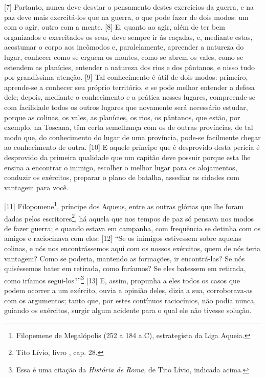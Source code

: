 {[}7{]} Portanto, nunca deve desviar o pensamento destes exercícios da
guerra, e na paz deve mais exercitá-los que na guerra, o que pode fazer
de dois modos: um com o agir, outro com a mente. {[}8{]} E, quanto ao
agir, além de ter bem organizados e exercitados os seus, deve sempre ir
às caçadas, e, mediante estas, acostumar o corpo aos incômodos e,
paralelamente, apreender a natureza do lugar, conhecer como se erguem os
montes, como se abrem os vales, como se estendem as planícies, entender
a natureza dos rios e dos pântanos, e nisso tudo por grandíssima
atenção. {[}9{]} Tal conhecimento é útil de dois modos: primeiro,
aprende-se a conhecer seu próprio território, e se pode melhor entender
a defesa dele; depois, mediante o conhecimento e a prática nesses
lugares, compreende-se com facilidade todos os outros lugares que
novamente será necessário estudar, porque as colinas, os vales, as
planícies, os rios, os pântanos, que estão, por exemplo, na Toscana, têm
certa semelhança com os de outras províncias, de tal modo que, do
conhecimento do lugar de uma província, pode-se facilmente chegar ao
conhecimento de outra. {[}10{]} E aquele príncipe que é desprovido desta
perícia é desprovido da primeira qualidade que um capitão deve possuir
porque esta lhe ensina a encontrar o inimigo, escolher o melhor lugar
para os alojamentos, conduzir os exércitos, preparar o plano de batalha,
assediar as cidades com vantagem para você.

{[}11{]} Filopomene\footnote{Filopemene de Megalópolis (252 a 184 a.C),
  estrategista da Liga Aqueia.}, príncipe dos Aqueus, entre as outras
glórias que lhe foram dadas pelos escritores\footnote{Tito Lívio, livro
  , cap. 28.}, há aquela que nos tempos de paz só pensava nos modos
de fazer guerra; e quando estava em campanha, com frequência se detinha
com os amigos e raciocinava com eles: {[}12{]} ``Se os inimigos
estivessem sobre aquelas colinas, e nós nos encontrássemos aqui com os
nossos exércitos, quem de nós teria vantagem? Como se poderia, mantendo
as formações, ir encontrá-las? Se nós quiséssemos bater em retirada,
como faríamos? Se eles batessem em retirada, como iríamos
segui-los?''\footnote{Essa é uma citação da \emph{História de Roma}, de
  Tito Lívio, indicada acima.} {[}13{]} E, assim, propunha a eles todos
os casos que podem ocorrer a um exército, ouvia a opinião deles, dizia a
sua, corroborava-as com os argumentos; tanto que, por estes contínuos
raciocínios, não podia nunca, guiando os exércitos, surgir algum
acidente para o qual ele não tivesse solução.

